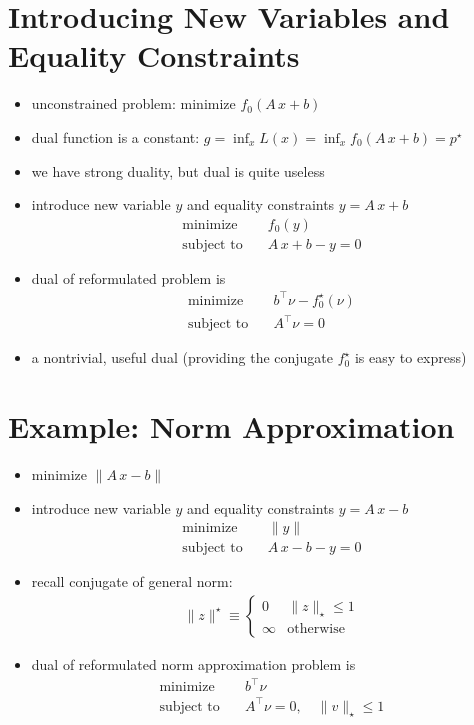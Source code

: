 \documentclass[11pt]{extarticle}
\newcommand{\ds}{\displaystyle}
\theoremstyle{definition}
\begin{document}
\newpage

\section*{Introducing New Variables and Equality Constraints}

\begin{itemize}\setlength\itemsep{0em}
  \item unconstrained problem: $\ds\text{minimize }f_0(A\,x + b)$ 
  \item dual function is a constant: $\ds g = \inf_x L(x) = \inf_x f_0(A\,x + b) = p^\star$
  \item we have strong duality, but dual is quite useless
  \item introduce new variable $y$ and equality constraints $\ds y = A\,x + b$
    \begin{align*}
      \text{minimize}\quad & f_0(y) \\
      \text{subject to}\quad & A\,x + b - y = 0
    \end{align*}
  \item dual of reformulated problem is 
    \begin{align*}
      \text{minimize}\quad & b^\top\nu - f_0^\star(\nu) \\
      \text{subject to}\quad & A^\top\nu = 0
    \end{align*}
  \item a nontrivial, useful dual (providing the conjugate $f_0^\star$ is easy to express)
\end{itemize}

\newpage

\section*{Example: Norm Approximation}

\begin{itemize}
  \item $\ds\text{minimize }\|A\,x - b\|$ 
  \item introduce new variable $y$ and equality constraints $\ds y = A\,x - b$
    \begin{align*}
      \text{minimize}\quad & \|y\| \\
      \text{subject to}\quad & A\,x - b - y = 0
    \end{align*}
  \item recall conjugate of general norm:
    \begin{align*}
      \|z\|^\star\equiv\begin{cases} 0 & \|z\|_\star \leqslant 1 \\ \infty & \text{otherwise} \end{cases}
    \end{align*}
  \item dual of reformulated norm approximation problem is 
    \begin{align*}
      \text{minimize}\quad & b^\top\nu \\
      \text{subject to}\quad & A^\top\nu = 0, \quad \|v\|_\star\leqslant 1
    \end{align*}
\end{itemize}
\end{document}
